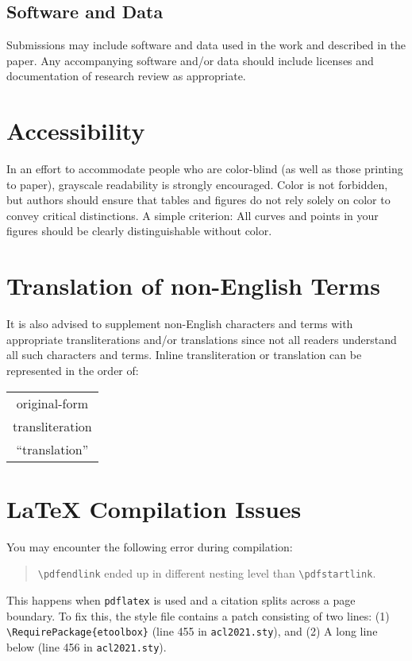 \documentclass[11pt,a4paper]{article}
\begin{document}
\subsection{Software and Data}
\label{sec:software_and_data}
Submissions may include software and data used in the work and described in the paper.
Any accompanying software and/or data should include licenses and documentation of research review as appropriate.

\section{Accessibility}
\label{ssec:accessibility}

In an effort to accommodate people who are color-blind (as well as those printing to paper), grayscale readability is strongly encouraged.
Color is not forbidden, but authors should ensure that tables and figures do not rely solely on color to convey critical distinctions.
A simple criterion:
All curves and points in your figures should be clearly distinguishable without color.

\section{Translation of non-English Terms}

It is also advised to supplement non-English characters and terms with appropriate transliterations and/or translations since not all readers understand all such characters and terms.
Inline transliteration or translation can be represented in the order of:
\begin{center}
\begin{tabular}{c}
original-form \\
transliteration \\
``translation''
\end{tabular}
\end{center}

\section{\LaTeX{} Compilation Issues}
You may encounter the following error during compilation: 
\begin{quote}
{\small\verb|\pdfendlink|} ended up in different nesting level than {\small\verb|\pdfstartlink|}.
\end{quote}
This happens when \texttt{\small pdflatex} is used and a citation splits across a page boundary.
To fix this, the style file contains a patch consisting of two lines:
(1) {\small\verb|\RequirePackage{etoolbox}|} (line 455 in \texttt{\small acl2021.sty}), and
(2) A long line below (line 456 in \texttt{\small acl2021.sty}).
\end{document}
